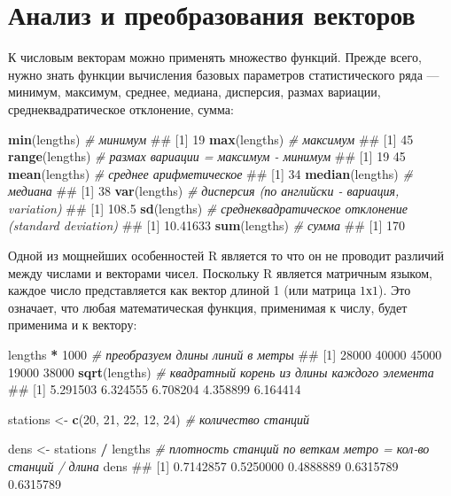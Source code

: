 \documentclass[]{book}
\newenvironment{Shaded}{\begin{snugshade}}{\end{snugshade}}
\newcommand{\KeywordTok}[1]{\textcolor[rgb]{0.13,0.29,0.53}{\textbf{#1}}}
\newcommand{\DecValTok}[1]{\textcolor[rgb]{0.00,0.00,0.81}{#1}}
\newcommand{\StringTok}[1]{\textcolor[rgb]{0.31,0.60,0.02}{#1}}
\newcommand{\CommentTok}[1]{\textcolor[rgb]{0.56,0.35,0.01}{\textit{#1}}}
\newcommand{\OperatorTok}[1]{\textcolor[rgb]{0.81,0.36,0.00}{\textbf{#1}}}
\newcommand{\NormalTok}[1]{#1}
\begin{document}
\section{Анализ и преобразования векторов}\label{vector_transform}

К числовым векторам можно применять множество функций. Прежде всего,
нужно знать функции вычисления базовых параметров статистического ряда
--- минимум, максимум, среднее, медиана, дисперсия, размах вариации,
среднеквадратическое отклонение, сумма:

\begin{Shaded}
\begin{Highlighting}[]
\KeywordTok{min}\NormalTok{(lengths) }\CommentTok{# минимум}
\NormalTok{## [1] 19}
\KeywordTok{max}\NormalTok{(lengths) }\CommentTok{# максимум}
\NormalTok{## [1] 45}
\KeywordTok{range}\NormalTok{(lengths) }\CommentTok{# размах вариации = максимум - минимум}
\NormalTok{## [1] 19 45}
\KeywordTok{mean}\NormalTok{(lengths) }\CommentTok{# среднее арифметическое}
\NormalTok{## [1] 34}
\KeywordTok{median}\NormalTok{(lengths) }\CommentTok{# медиана}
\NormalTok{## [1] 38}
\KeywordTok{var}\NormalTok{(lengths) }\CommentTok{# дисперсия (по английски - вариация, variation)}
\NormalTok{## [1] 108.5}
\KeywordTok{sd}\NormalTok{(lengths) }\CommentTok{# среднеквадратическое отклонение (standard deviation)}
\NormalTok{## [1] 10.41633}
\KeywordTok{sum}\NormalTok{(lengths) }\CommentTok{# сумма}
\NormalTok{## [1] 170}
\end{Highlighting}
\end{Shaded}

Одной из мощнейших особенностей R является то что он не проводит
различий между числами и векторами чисел. Поскольку R является матричным
языком, каждое число представляется как вектор длиной 1 (или матрица
\(1х1\)). Это означает, что любая математическая функция, применимая к
числу, будет применима и к вектору:

\begin{Shaded}
\begin{Highlighting}[]
\NormalTok{lengths }\OperatorTok{*}\StringTok{ }\DecValTok{1000} \CommentTok{# преобразуем длины линий в метры}
\NormalTok{## [1] 28000 40000 45000 19000 38000}
\KeywordTok{sqrt}\NormalTok{(lengths) }\CommentTok{# квадратный корень из длины каждого элемента}
\NormalTok{## [1] 5.291503 6.324555 6.708204 4.358899 6.164414}

\NormalTok{stations <-}\StringTok{ }\KeywordTok{c}\NormalTok{(}\DecValTok{20}\NormalTok{, }\DecValTok{21}\NormalTok{, }\DecValTok{22}\NormalTok{, }\DecValTok{12}\NormalTok{, }\DecValTok{24}\NormalTok{) }\CommentTok{# количество станций}

\NormalTok{dens <-}\StringTok{ }\NormalTok{stations }\OperatorTok{/}\StringTok{ }\NormalTok{lengths }\CommentTok{# плотность станций по веткам метро = кол-во станций / длина }
\NormalTok{dens}
\NormalTok{## [1] 0.7142857 0.5250000 0.4888889 0.6315789 0.6315789}
\end{Highlighting}
\end{Shaded}
\end{document}
